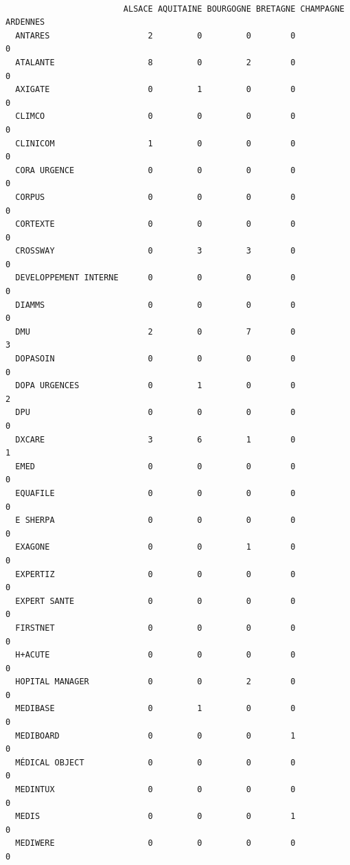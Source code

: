 \documentclass[]{article}
\begin{document}
\begin{verbatim}
                       
                        ALSACE AQUITAINE BOURGOGNE BRETAGNE CHAMPAGNE ARDENNES
  ANTARES                    2         0         0        0                  0
  ATALANTE                   8         0         2        0                  0
  AXIGATE                    0         1         0        0                  0
  CLIMCO                     0         0         0        0                  0
  CLINICOM                   1         0         0        0                  0
  CORA URGENCE               0         0         0        0                  0
  CORPUS                     0         0         0        0                  0
  CORTEXTE                   0         0         0        0                  0
  CROSSWAY                   0         3         3        0                  0
  DEVELOPPEMENT INTERNE      0         0         0        0                  0
  DIAMMS                     0         0         0        0                  0
  DMU                        2         0         7        0                  3
  DOPASOIN                   0         0         0        0                  0
  DOPA URGENCES              0         1         0        0                  2
  DPU                        0         0         0        0                  0
  DXCARE                     3         6         1        0                  1
  EMED                       0         0         0        0                  0
  EQUAFILE                   0         0         0        0                  0
  E SHERPA                   0         0         0        0                  0
  EXAGONE                    0         0         1        0                  0
  EXPERTIZ                   0         0         0        0                  0
  EXPERT SANTE               0         0         0        0                  0
  FIRSTNET                   0         0         0        0                  0
  H+ACUTE                    0         0         0        0                  0
  HOPITAL MANAGER            0         0         2        0                  0
  MEDIBASE                   0         1         0        0                  0
  MEDIBOARD                  0         0         0        1                  0
  MÉDICAL OBJECT             0         0         0        0                  0
  MEDINTUX                   0         0         0        0                  0
  MEDIS                      0         0         0        1                  0
  MEDIWERE                   0         0         0        0                  0

\end{verbatim}
\end{document}
